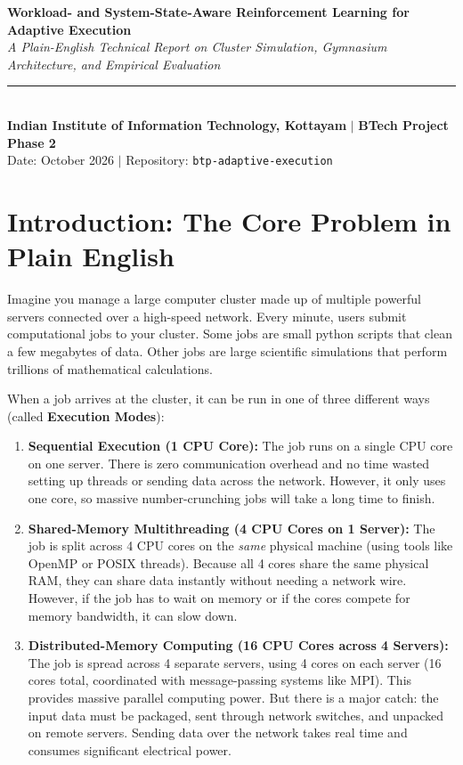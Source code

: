 \documentclass[11pt,a4paper]{article}
\begin{document}
\begin{center}
    {\LARGE \textbf{\textcolor{primarynavy}{Workload- and System-State-Aware Reinforcement Learning for Adaptive Execution}}}\\[0.8em]
    {\large \textit{A Plain-English Technical Report on Cluster Simulation, Gymnasium Architecture, and Empirical Evaluation}}\\[0.6em]
    \rule{\textwidth}{1.2pt}\\[0.4em]
    \textbf{Indian Institute of Information Technology, Kottayam} \quad $\vert$ \quad \textbf{BTech Project Phase 2}\\[0.2em]
    \small{\textcolor{secondaryslate}{Date: October 2026 \quad $\vert$ \quad Repository: \texttt{btp-adaptive-execution}}}
\end{center}
\vspace{1em}

\section{Introduction: The Core Problem in Plain English}
Imagine you manage a large computer cluster made up of multiple powerful servers connected over a high-speed network. Every minute, users submit computational jobs to your cluster. Some jobs are small python scripts that clean a few megabytes of data. Other jobs are large scientific simulations that perform trillions of mathematical calculations.

When a job arrives at the cluster, it can be run in one of three different ways (called \textbf{Execution Modes}):
\begin{enumerate}[noitemsep, topsep=2pt]
    \item \textbf{Sequential Execution (1 CPU Core):} The job runs on a single CPU core on one server. There is zero communication overhead and no time wasted setting up threads or sending data across the network. However, it only uses one core, so massive number-crunching jobs will take a long time to finish.
    \item \textbf{Shared-Memory Multithreading (4 CPU Cores on 1 Server):} The job is split across 4 CPU cores on the \textit{same} physical machine (using tools like OpenMP or POSIX threads). Because all 4 cores share the same physical RAM, they can share data instantly without needing a network wire. However, if the job has to wait on memory or if the cores compete for memory bandwidth, it can slow down.
    \item \textbf{Distributed-Memory Computing (16 CPU Cores across 4 Servers):} The job is spread across 4 separate servers, using 4 cores on each server (16 cores total, coordinated with message-passing systems like MPI). This provides massive parallel computing power. But there is a major catch: the input data must be packaged, sent through network switches, and unpacked on remote servers. Sending data over the network takes real time and consumes significant electrical power.
\end{enumerate}
\end{document}
